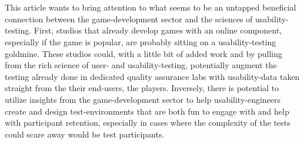 \documentclass{article}
\begin{document}
  \thispagestyle{empty}

  \\
  \hspace*{0.0cm}
  \\

  {\large
    This article wants to bring attention to what seems to be an untapped
    beneficial connection between the game-development sector and the sciences
    of usability-testing. First, studios that already develop games with an
    online component, especially if the game is popular, are probably sitting
    on a usability-testing goldmine. These studios could, with a little bit of
    added work and by pulling from the rich science of user- and
    usability-testing, potentially augment the testing already done in
    dedicated quality assurance labs with usability-data taken straight from
    the their end-users, the players. Inversely, there is potential to utilize
    insights from the game-development sector to help usability-engineers
    create and design test-environments that are both fun to engage with and
    help with participant retention, especially in cases where the complexity
    of the tests could scare away would be test participants.
  }
  \vspace{0.2cm}
  {
     \\
    \hspace*{\fill}
  }
  \vspace{-0.3cm}
\end{document}
